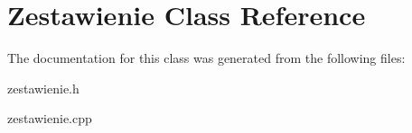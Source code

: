 \hypertarget{class_zestawienie}{}\section{Zestawienie Class Reference}
\label{class_zestawienie}


The documentation for this class was generated from the following files\+:\begin{DoxyCompactItemize}
\item 
zestawienie.\+h\item 
zestawienie.\+cpp\end{DoxyCompactItemize}
